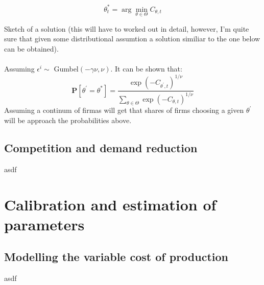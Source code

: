 \documentclass{article}
\begin{document}
\begin{equation}
    \theta^*_{t} = \arg\min_{\theta \in \Theta} C_{\theta, t} 
\end{equation}

Sketch of a solution (this will have to worked out in detail, however, 
I'm quite sure that given some distributional assumtion a solution 
similiar to the one below can be obtained). 
\\  
\\
Assuming $\epsilon^i \sim $ Gumbel$(-\gamma \nu,\nu)$. It can be shown that:
\begin{equation}
    \mathbf{P}[\theta^{'} = \theta^{*}] = \frac{\exp(-C_{\theta^{'}, t})^{1/\nu}}{\sum_{\theta \in \Theta}\exp(-C_{\theta, t})^{1/\nu}}
\end{equation}
Assuming a continum of firmas will get that shares of firms choosing a given $\theta^{'}$ will be approach the probabilities above. 

\subsection{Competition and demand reduction}
asdf
\section{Calibration and estimation of parameters}
\subsection{Modelling the variable cost of production}
asdf
\end{document}
